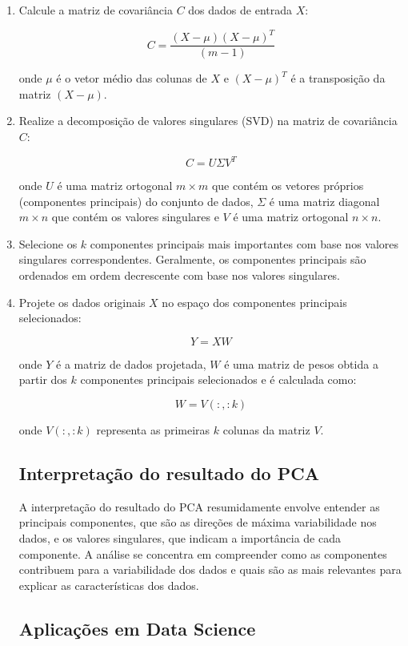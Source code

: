 \documentclass[12pt, a4paper]{article}
\begin{document}
\begin{enumerate}
  \item Calcule a matriz de covariância $C$ dos dados de entrada $X$:

  \[
  C = \frac{(X - \mu)(X - \mu)^T}{(m - 1)}
  \]

  onde $\mu$ é o vetor médio das colunas de $X$ e $(X - \mu)^T$ é a transposição da matriz $(X - \mu)$.

  \item Realize a decomposição de valores singulares (SVD) na matriz de covariância $C$:

  \[
  C = U \Sigma V^T
  \]

  onde $U$ é uma matriz ortogonal $m \times m$ que contém os vetores próprios (componentes principais) do conjunto de dados, $\Sigma$ é uma matriz diagonal $m \times n$ que contém os valores singulares e $V$ é uma matriz ortogonal $n \times n$.

  \item Selecione os $k$ componentes principais mais importantes com base nos valores singulares correspondentes. Geralmente, os componentes principais são ordenados em ordem decrescente com base nos valores singulares.

  \item Projete os dados originais $X$ no espaço dos componentes principais selecionados:

  \[
  Y = XW
  \]

  onde $Y$ é a matriz de dados projetada, $W$ é uma matriz de pesos obtida a partir dos $k$ componentes principais selecionados e é calculada como:

  \[
  W = V(:, :k)
  \]

  onde $V(:, :k)$ representa as primeiras $k$ colunas da matriz $V$.

\subsection{Interpretação do resultado do PCA}
A interpretação do resultado do PCA resumidamente envolve entender as principais componentes, que são as direções de máxima variabilidade nos dados, e os valores singulares, que indicam a importância de cada componente. A análise se concentra em compreender como as componentes contribuem para a variabilidade dos dados e quais são as mais relevantes para explicar as características dos dados.

\subsection{Aplicações em Data Science}


\end{enumerate}
\end{document}
